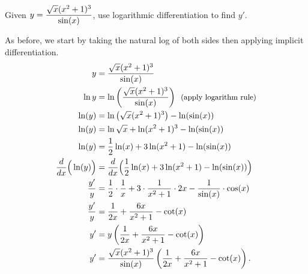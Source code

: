 \begin{example} \label{Ex:2.8.Eg3}
Given $\displaystyle y = \frac{\sqrt{x}(x^2 + 1)^3}{\sin(x)}$, use logarithmic differentiation to find $y'$.

\solution As before, we start by taking the natural log of both sides then applying implicit differentiation.
\begin{align*}
y &= \frac{\sqrt{x}(x^2 + 1)^3}{\sin(x)} \\
\ln{y} &= \ln \left( \frac{\sqrt{x}(x^2 + 1)^3}{\sin(x)}  \right) \enskip \text{\small (apply logarithm rule)} \\
\ln (y) &= \ln \left( \sqrt{x}(x^2 + 1)^3 \right) - \ln( \sin(x) ) \\
\ln (y) &= \ln{\sqrt{x}} + \ln(x^2 + 1)^3 - \ln(\sin(x)) \\
\ln (y) &= \frac{1}{2} \ln(x) + 3\ln(x^2 + 1) - \ln(\sin(x)) \\
\frac{d}{dx}\Big(\ln (y)\Big) &= \frac{d}{dx}\Big( \frac{1}{2} \ln(x) + 3\ln(x^2 + 1) - \ln(\sin(x)) \Big) \\
\frac{y'}{y} &= \frac{1}{2} \cdot \frac{1}{x} + 3\cdot\frac{1}{x^2+1}\cdot 2x - \frac{1}{\sin(x)} \cdot \cos(x) \\
\frac{y'}{y} &= \frac{1}{2x} + \frac{6x}{x^2+1} - \cot(x) \\
y' &=y \left( \frac{1}{2x} + \frac{6x}{x^2+1} - \cot(x) \right) \\
y' &= \frac{\sqrt{x}(x^2 + 1)^3}{\sin(x)} \left( \frac{1}{2x} + \frac{6x}{x^2+1} - \cot(x) \right).
\end{align*} 
\end{example}